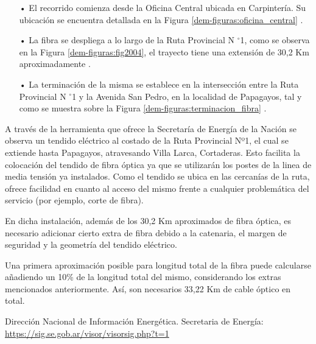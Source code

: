  
\begin{itemize} 


\item[•] El recorrido comienza desde la Oficina Central ubicada en Carpintería. Su ubicación se encuentra detallada en la Figura \ref{dem-figuras:oficina_central} . 





\item[•] La fibra se despliega a lo largo de la Ruta Provincial N $^{\circ}$1, como se observa en la Figura \ref{dem-figuras:fig2004}, el trayecto tiene una extensión de 30,2 Km aproximadamente \cite{secretaria}.


\item[•] La terminación de la misma se establece en la intersección entre la Ruta Provincial N $^{\circ}$1 y la Avenida San Pedro, en la localidad de Papagayos, tal y como se muestra sobre la Figura \ref{dem-figuras:terminacion_fibra} .

\end{itemize}

 


A través de la herramienta que ofrece la Secretaría de Energía de la Nación se observa un tendido eléctrico al costado de la Ruta Provincial Nº1, el cual se extiende hasta Papagayos, atravesando Villa Larca, Cortaderas. Esto facilita la colocación del tendido de fibra óptica ya que se utilizarán los postes de la linea de media tensión ya instalados.
Como el tendido se ubica en las cercanías de la ruta, ofrece facilidad en cuanto al acceso del mismo frente a cualquier problemática del servicio (por ejemplo, corte de fibra).



En dicha instalación, además de los 30,2 Km aproximados de fibra óptica, es necesario adicionar cierto extra de fibra debido a la catenaria, el margen de seguridad y la geometría del tendido eléctrico.

Una primera aproximación posible para longitud total de la fibra puede calcularse añadiendo un 10\% de la longitud total del mismo, considerando los extras mencionados anteriormente. Así, son necesarios 33,22 Km de cable óptico en total.






\newpage

\begin{thebibliography}{99}
Dirección Nacional de Información Energética. Secretaria de Energía: \url{https://sig.se.gob.ar/visor/visorsig.php?t=1}

\end{thebibliography}


\newpage